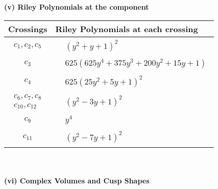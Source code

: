 \documentclass[1p]{elsarticle_modified}
\theoremstyle{definition}
\begin{document}
\newpage\renewcommand{\arraystretch}{1}
\flushleft \textbf{(v) Riley Polynomials at the component}\newline \\
\begin{tabular}{m{50pt}|m{274pt}}
Crossings & \hspace{64pt}Riley Polynomials at each crossing \\
\hline $$\begin{aligned}c_{1},c_{2},c_{5}\end{aligned}$$&$\begin{aligned}
&(y^2+y+1)^2
\end{aligned}$\\
\hline $$\begin{aligned}c_{3}\end{aligned}$$&$\begin{aligned}
&625(625 y^4+375 y^3+200 y^2+15 y+1)
\end{aligned}$\\
\hline $$\begin{aligned}c_{4}\end{aligned}$$&$\begin{aligned}
&625(25 y^2+5 y+1)^2
\end{aligned}$\\
\hline $$\begin{aligned}c_{6},c_{7},c_{8}\\c_{10},c_{12}\end{aligned}$$&$\begin{aligned}
&(y^2-3 y+1)^2
\end{aligned}$\\
\hline $$\begin{aligned}c_{9}\end{aligned}$$&$\begin{aligned}
&y^4
\end{aligned}$\\
\hline $$\begin{aligned}c_{11}\end{aligned}$$&$\begin{aligned}
&(y^2-7 y+1)^2
\end{aligned}$\\
\hline
\end{tabular}\\~\\
\newpage\flushleft \textbf{(vi) Complex Volumes and Cusp Shapes}
\end{document}
